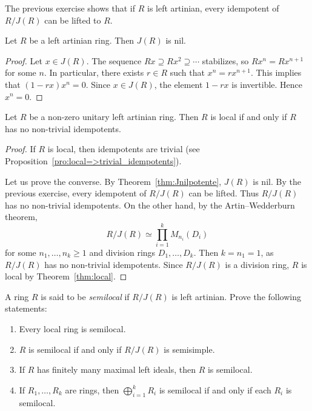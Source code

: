 The previous exercise shows that if $R$ is left artinian, 
every idempotent of $R/J(R)$ can be lifted to $R$. 

\begin{lemma}
\label{lem:J(R)_nil}
    Let $R$ be a left artinian ring. Then $J(R)$ is nil. 
\end{lemma}

\begin{proof}
    Let $x\in J(R)$. The sequence $Rx\supseteq Rx^2\supseteq\cdots$ stabilizes, so
    $Rx^n=Rx^{n+1}$ for some $n$. In particular, there exists $r\in R$ 
    such that $x^n=rx^{n+1}$. This implies that $(1-rx)x^n=0$. Since $x\in J(R)$, 
    the element $1-rx$ is invertible. Hence $x^n=0$.  
\end{proof}

\begin{theorem}
\label{thm:local_idempotent}
    Let $R$ be a non-zero unitary left artinian ring. Then $R$ is local if and only if 
    $R$ has no non-trivial idempotents. 
\end{theorem}

\begin{proof}
    If $R$ is local, then idempotents are trivial (see Proposition~\ref{pro:local=>trivial_idempotents}). 

    Let us prove the converse. By Theorem~\ref{thm:Jnilpotente}, $J(R)$ is nil. 
    By the previous exercise, every idempotent of $R/J(R)$ can be lifted. Thus $R/J(R)$ has 
    no non-trivial idempotents. On the other hand, by the Artin--Wedderburn theorem, 
    \[
    R/J(R)\simeq\prod_{i=1}^kM_{n_i}(D_i)
    \]
    for some $n_1,\dots,n_k\geq1$ and division rings $D_1,\dots,D_k$. Then 
    $k=n_1=1$, as $R/J(R)$ has no non-trivial idempotents. Since $R/J(R)$ is a division ring, 
    $R$ is local by Theorem~\ref{thm:local}. 
\end{proof}


\begin{bonus}
\label{xca:semilocal}
    A ring $R$ is said to be \emph{semilocal} if $R/J(R)$ is left artinian. 
    Prove the following statements:
    \begin{enumerate}
        \item Every local ring is semilocal.
        \item $R$ is semilocal if and only if $R/J(R)$ is semisimple.
        \item If $R$ has finitely many maximal left ideals, then $R$ is semilocal. 
        \item If $R_1,\dots,R_k$ are rings, then $\bigoplus_{i=1}^k R_i$ is semilocal
            if and only if each $R_i$ is semilocal. 
    \end{enumerate}
\end{bonus}

